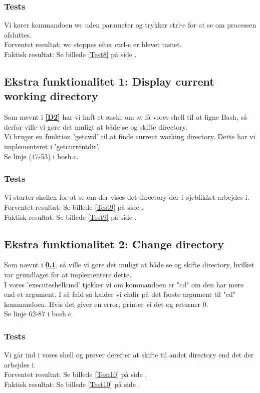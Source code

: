 \subsubsection{Tests}
Vi kører kommandoen wc uden parameter og trykker ctrl-c for at se om processen afsluttes.
\\Forventet resultat: wc stoppes efter ctrl-c er blevet tastet.
\\Faktisk resultat: Se billede \ref{Test8} på side \pageref{Test8}.

\subsection{Ekstra funktionalitet 1: Display current working directory}
\label{E1}
Som nævnt i \textbf{\ref{D2}} har vi haft et ønske om at få vores shell til at ligne Bash, så derfor ville vi gøre det muligt at både se og skifte directory.
\\Vi bruger en funktion 'getcwd' til at finde current working directory. Dette har vi implementeret i 'getcurrentdir'.
\\Se linje (47-53) i bosh.c.
\subsubsection{Tests}
Vi starter shellen for at se om der vises det directory der i øjeblikket arbejdes i.
\\Forventet resultat: Se billede \ref{Test9} på side \pageref{Test9}.
\\Faktisk resultat: Se billede \ref{Test9} på side \pageref{Test9}.

\subsection{Ekstra funktionalitet 2: Change directory}
\label{E2}
Som nævnt i \textbf{\ref{E1}}, så ville vi gøre det muligt at både se og skifte directory, hvilket var grundlaget for at implementere dette.
\\I vores 'executeshellcmd' tjekker vi om kommandoen er "cd" om den har mere end et argument. I så fald så kalder vi chdir på det første argument til "cd" kommandoen. Hvis det giver en error, printer vi det og returner 0.
\\Se linje 62-87 i bosh.c.
\subsubsection{Tests}
Vi går ind i vores shell og prøver derefter at skifte til andet directory end det der arbejdes i.
\\Forventet resultat: Se billede \ref{Test10} på side \pageref{Test10}.
\\Faktisk resultat: Se billede \ref{Test10} på side \pageref{Test10}.